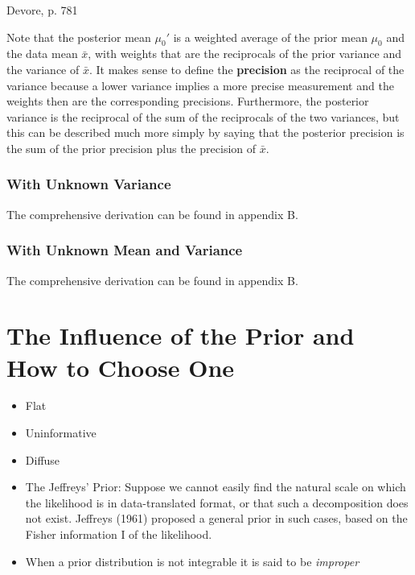 Devore, p. 781 

Note that the posterior mean $\mu_0'$ is a weighted average of the prior mean $\mu_0$ and the data mean $\bar{x}$, with weights that are the reciprocals of the prior variance and the variance of $\bar{x}$. It makes sense to define the \textbf{precision} as the reciprocal of the variance because a lower variance implies a more precise measurement and the weights then are the corresponding precisions. Furthermore, the posterior variance is the reciprocal of the sum of the reciprocals of the two variances, but this can be described much more simply by saying that the posterior precision is the sum of the prior precision plus the precision of $\bar{x}$. 

\subsubsection{With Unknown Variance}

The comprehensive derivation can be found in appendix B. 

\subsubsection{With Unknown Mean and Variance}

The comprehensive derivation can be found in appendix B. 




\section{The Influence of the Prior and How to Choose One}\label{sec:prior}

\begin{itemize}
    \item Flat
    \item Uninformative
    \item Diffuse
    \item The Jeffreys’ Prior: Suppose we cannot easily find the natural scale on which the likelihood is in data-translated format, or that such a decomposition does not exist. Jeffreys (1961) proposed a general prior in such cases, based on the Fisher information I of the likelihood. 
    \item When a prior distribution is not integrable it is said to be \textit{improper}
\end{itemize}


